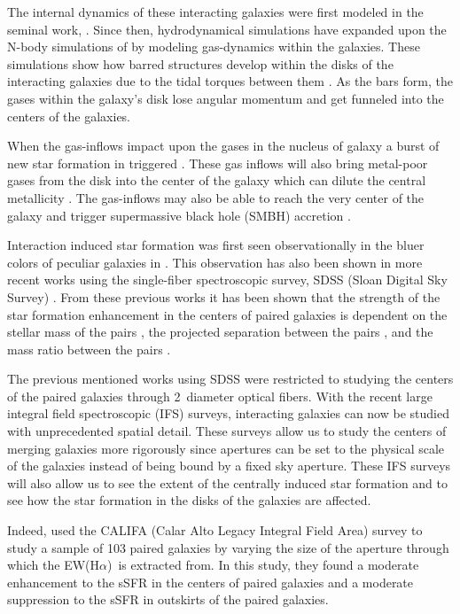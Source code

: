 \documentclass[iop,revtex4,twocolumn,apj,numberedappendix,appendixfloats]{emulateapj}
\newcommand{\ewha}{EW(H$\alpha$)}
\begin{document}
The internal dynamics of these interacting galaxies were first modeled in the seminal work, \citet{Toomre:1972}. Since then, hydrodynamical simulations have expanded upon the N-body simulations of \citet{Toomre:1972} by modeling gas-dynamics within the galaxies. These simulations show how barred structures develop within the disks of the interacting galaxies due to the tidal torques between them \citep{Barnes:1991}. As the bars form, the gases within the galaxy's disk lose angular momentum and get funneled into the centers of the galaxies. 

When the gas-inflows impact upon the gases in the nucleus of galaxy a burst of new star formation in triggered \citep{Barnes:1996, Mihos:1996}. These gas inflows will also bring metal-poor gases from the disk into the center of the galaxy which can dilute the central metallicity \citep{Rupke:2010, Perez:2011, Scudder:2012}. The gas-inflows may also be able to reach the very center of the galaxy and trigger supermassive black hole (SMBH) accretion \citep{Capelo:2017}. 

Interaction induced star formation was first seen observationally in the bluer colors of peculiar galaxies in \citet{Larson:1978}. This observation has also been shown in more recent works using the single-fiber spectroscopic survey, SDSS (Sloan Digital Sky Survey) \citep{Ellison:2008, Li:2008, Scudder:2012, Patton:2013, Bustamante:2020}. From these previous works it has been shown that the strength of the star formation enhancement in the centers of paired galaxies is dependent on the stellar mass of the pairs \citep{Li:2008}, the projected separation between the pairs \citep{Ellison:2008, Li:2008, Scudder:2012}, and the mass ratio between the pairs \citep{Ellison:2008}. 

The previous mentioned works using SDSS were restricted to studying the centers of the paired galaxies through 2\arcsec\ diameter optical fibers. With the recent large integral field spectroscopic (IFS) surveys, interacting galaxies can now be studied with unprecedented spatial detail. These surveys allow us to study the centers of merging galaxies more rigorously since apertures can be set to the physical scale of the galaxies instead of being bound by a fixed sky aperture. These IFS surveys will also allow us to see the extent of the centrally induced star formation and to see how the star formation in the disks of the galaxies are affected. 

Indeed, \citet{Barrera-Ballesteros:2015} used the CALIFA (Calar Alto Legacy Integral Field Area) survey to study a sample of 103 paired galaxies by varying the size of the aperture through which the \ewha\ is extracted from. In this study, they found a moderate enhancement to the sSFR in the centers of paired galaxies and a moderate suppression to the sSFR in outskirts of the paired galaxies. 
\end{document}
